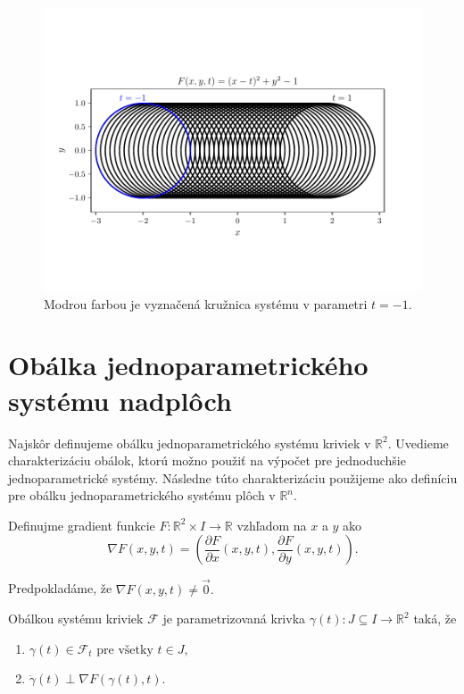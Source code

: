 \begin{figure}[H]
	\centering
	\includegraphics[trim={0 1.65cm 0 2cm},clip]{images/one_element_of_system.pdf}
	\caption[Zobrazenie prvkov systému.]{Modrou farbou je vyznačená kružnica systému v parametri $t=-1$.}
	\label{fig:one_element_of_system}
\end{figure}

\section{Obálka jednoparametrického systému nadplôch}
Najskôr definujeme obálku jednoparametrického systému kriviek v $\mathbb{R}^2$. Uvedieme charakterizáciu obálok, ktorú možno použiť na výpočet pre jednoduchšie jednoparametrické systémy. Následne túto charakterizáciu použijeme ako definíciu pre obálku jednoparametrického systému plôch v $\mathbb{R}^n$.

\begin{definition}
Definujme gradient funkcie $F \colon \mathbb{R}^2 \times I \rightarrow \mathbb{R}$ vzhľadom na $x$ a $y$ ako
$$\nabla F(x, y, t) = \left(\frac{\partial F}{\partial x}(x, y, t), \frac{\partial F}{\partial y}(x, y, t) \right).$$ 
\end{definition}
Predpokladáme, že $\nabla F(x,y,t) \neq \vec{0}. $ 

\begin{definition}
Obálkou systému kriviek $ \mathcal{F} $ je parametrizovaná krivka $\gamma(t) \colon J \subseteq I \rightarrow \mathbb{R}^{2}$ taká, že 
\begin{enumerate}
\item $\gamma(t) \in \mathcal{F}_{t} \text{ pre všetky } t \in J,$
\item $\dot{\gamma}(t) \perp \nabla F \left( \gamma(t), t \right).$
\end{enumerate}
\end{definition}

